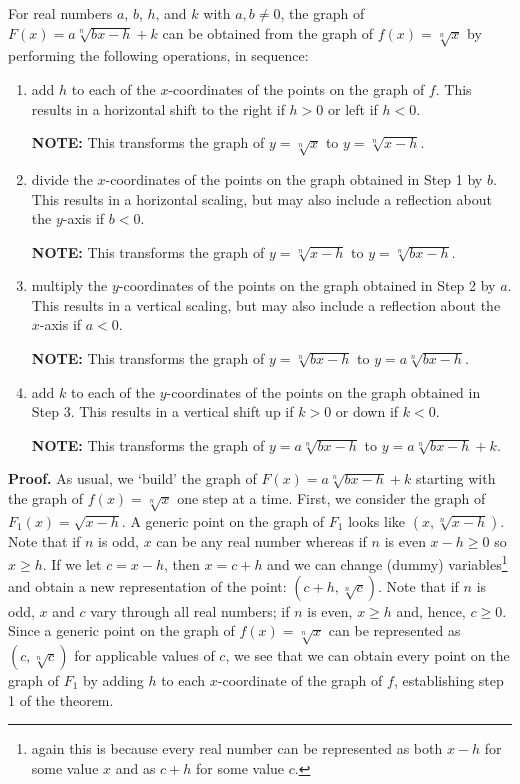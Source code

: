 \documentclass{ximera}
\begin{document}
\begin{theorem} \label{linearrootgraphs}  For real numbers $a$, $b$, $h$, and $k$ with $a, b \neq 0$, the graph of $F(x) = a\sqrt[n]{bx-h} +k$  can be obtained from the graph of $f(x) = \sqrt[n]{x}$ by performing the following operations, in sequence:


\begin{enumerate}

\item  add $h$ to each of the $x$-coordinates of the points on the graph of $f$.  This results in a horizontal shift to the right if $h > 0$ or left if $h < 0$.

\textbf{NOTE:}  This transforms the graph of $y = \sqrt[n]{x}$ to $y = \sqrt[n]{x-h}$.

\item  divide the $x$-coordinates of the points on the graph obtained in Step 1 by $b$.  This results in a horizontal scaling, but may also include a reflection about the $y$-axis if $b < 0$.

\textbf{NOTE:}  This transforms the graph of $y = \sqrt[n]{x-h}$ to $y = \sqrt[n]{bx-h}$.

\item  multiply the $y$-coordinates of the points on the graph obtained in Step 2 by $a$.   This results in a vertical scaling, but may also include a reflection about the $x$-axis if $a < 0$.

\textbf{NOTE:}  This transforms the graph of $y = \sqrt[n]{bx-h}$ to $y = a\sqrt[n]{bx-h}$.

\item  add $k$ to each of the $y$-coordinates of the points on the graph obtained in Step 3.  This results in a vertical shift up if $k > 0$ or down if $k< 0$.

\textbf{NOTE:}  This transforms the graph of $y = a\sqrt[n]{bx-h}$ to $y = a\sqrt[n]{bx-h} + k$.

\end{enumerate}


\end{theorem}


 {\bf Proof.}  As usual, we `build' the graph of $F(x) = a \sqrt[n]{bx-h}+k$ starting with the graph of $f(x) = \sqrt[n]{x}$ one step at a time.  First, we consider the graph of $F_{1}(x) = \sqrt{x-h}$.  A generic point on the graph of $F_{1}$ looks like $(x, \sqrt[n]{x-h})$.  Note that if $n$ is odd, $x$ can be any real number whereas if $n$ is even $x-h \geq 0$ so $x \geq h$.   If we let $c = x-h$, then $x = c+h$ and we can change (dummy) variables\footnote{again this is because every real number can be represented as both $x-h$ for some value $x$ and as $c+h$  for some value $c$.} and obtain a new representation of the point: $(c+h, \sqrt[n]{c})$.  Note that if $n$ is odd, $x$ and $c$ vary through all real numbers;  if $n$ is even, $x \geq h$ and, hence,  $c \geq 0$.  Since a generic point on the graph of $f(x) = \sqrt[n]{x}$ can be represented as $(c, \sqrt[n]{c})$ for applicable values of $c$, we see that we can obtain every point on the graph of $F_{1}$ by adding $h$ to each $x$-coordinate of the graph of $f$, establishing step 1 of the theorem.  
 
\end{document}
